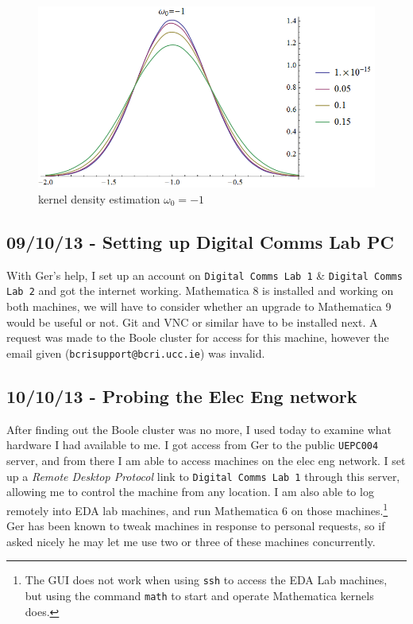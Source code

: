 \begin{figure}[htbp]
\centering
\includegraphics[width=\linewidth]{../../../plots/fyp1_w0_kde.png}
\caption{kernel density estimation $\omega_0=-1$}
\end{figure}

\subsection{09/10/13 - Setting up Digital Comms Lab PC}

With Ger's help, I set up an account on \texttt{Digital Comms Lab 1} \&
\texttt{Digital Comms Lab 2} and got the internet working. Mathematica 8
is installed and working on both machines, we will have to consider
whether an upgrade to Mathematica 9 would be useful or not. Git and VNC
or similar have to be installed next. A request was made to the Boole
cluster for access for this machine, however the email given
(\texttt{bcrisupport@bcri.ucc.ie}) was invalid.

\subsection{10/10/13 - Probing the Elec Eng network}

After finding out the Boole cluster was no more, I used today to examine
what hardware I had available to me. I got access from Ger to the public
\texttt{UEPC004} server, and from there I am able to access machines on
the elec eng network. I set up a \emph{Remote Desktop Protocol} link to
\texttt{Digital Comms Lab 1} through this server, allowing me to control
the machine from any location. I am also able to log remotely into EDA
lab machines, and run Mathematica 6 on those machines.\footnote{The GUI
  does not work when using \texttt{ssh} to access the EDA Lab machines,
  but using the command \texttt{math} to start and operate Mathematica
  kernels does.} Ger has been known to tweak machines in response to
personal requests, so if asked nicely he may let me use two or three of
these machines concurrently.

